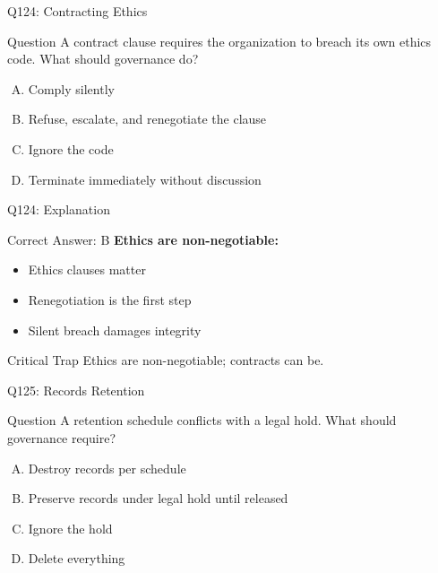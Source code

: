 \documentclass{beamer}
\begin{document}
	\begin{frame}{Q124: Contracting Ethics}
		\begin{block}{Question}
			A contract clause requires the organization to breach its own ethics code. What should governance do?
		\end{block}
		\begin{enumerate}[(A)]
			\item Comply silently
			\item Refuse, escalate, and renegotiate the clause
			\item Ignore the code
			\item Terminate immediately without discussion
		\end{enumerate}
	\end{frame}
	
	\begin{frame}{Q124: Explanation}
		\begin{block}{Correct Answer: B}
			\textbf{Ethics are non-negotiable:}
			\begin{itemize}
				\item Ethics clauses matter
				\item Renegotiation is the first step
				\item Silent breach damages integrity
			\end{itemize}
		\end{block}
		\begin{alertblock}{Critical Trap}
			Ethics are non-negotiable; contracts can be.
		\end{alertblock}
	\end{frame}
	
	\begin{frame}{Q125: Records Retention}
		\begin{block}{Question}
			A retention schedule conflicts with a legal hold. What should governance require?
		\end{block}
		\begin{enumerate}[(A)]
			\item Destroy records per schedule
			\item Preserve records under legal hold until released
			\item Ignore the hold
			\item Delete everything
		\end{enumerate}
	\end{frame}
	
\end{document}
